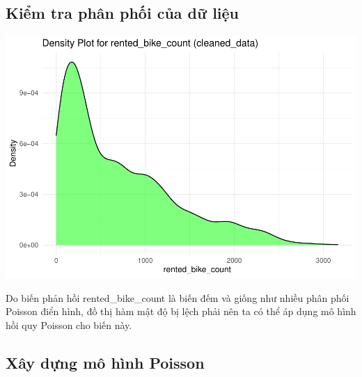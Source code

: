 \documentclass[
  11pt,
  letterpaper,
]{article}
\begin{document}
\subsection{Kiểm tra phân phối của dữ liệu}

\begin{center}\includegraphics[width=1.2\linewidth,]{Final_Project_files/figure-latex/unnamed-chunk-16-1} \end{center}

Do biến phản hồi rented\_bike\_count là biến đếm và giống như nhiều phân phối Poisson điển hình, đồ thị hàm mật độ bị lệch phải nên ta có thể áp dụng mô hình hồi quy Poisson cho biến này.

\subsection{Xây dựng mô hình Poisson}
\end{document}
